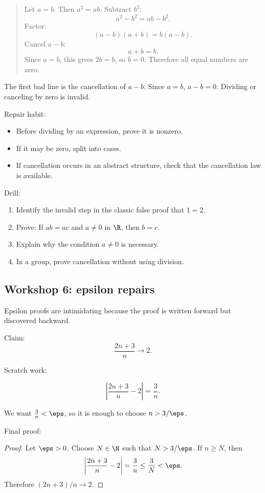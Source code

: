 \begin{quote}
Let $a=b$. Then $a^2=ab$. Subtract $b^2$:
\[
a^2-b^2=ab-b^2.
\]
Factor:
\[
(a-b)(a+b)=b(a-b).
\]
Cancel $a-b$:
\[
a+b=b.
\]
Since $a=b$, this gives $2b=b$, so $b=0$. Therefore all equal numbers are zero.
\end{quote}

The first bad line is the cancellation of $a-b$. Since $a=b$, $a-b=0$. Dividing or canceling by zero is invalid.

Repair habit:

\begin{itemize}
\item Before dividing by an expression, prove it is nonzero.
\item If it may be zero, split into cases.
\item If cancellation occurs in an abstract structure, check that the cancellation law is available.
\end{itemize}

Drill:

\begin{enumerate}
\item Identify the invalid step in the classic false proof that $1=2$.
\item Prove: If $ab=ac$ and $a\neq0$ in $\R$, then $b=c$.
\item Explain why the condition $a\neq0$ is necessary.
\item In a group, prove cancellation without using division.
\end{enumerate}

\subsection{Workshop 6: epsilon repairs}

Epsilon proofs are intimidating because the proof is written forward but discovered backward.

Claim:
\[
\frac{2n+3}{n}\to2.
\]

Scratch work:

\[
\left|\frac{2n+3}{n}-2\right|=\frac3n.
\]

We want $\frac3n<\eps$, so it is enough to choose $n>3/\eps$.

Final proof:

\begin{proof}
Let $\eps>0$. Choose $N\in\N$ such that $N>3/\eps$. If $n\geq N$, then
\[
\left|\frac{2n+3}{n}-2\right|=\frac3n\leq\frac3N<\eps.
\]
Therefore $(2n+3)/n\to2$.
\end{proof}

